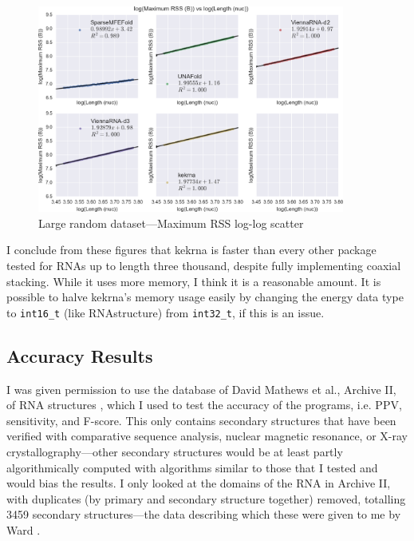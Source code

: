 \documentclass{cshonours}
\begin{document}
\begin{figure}[p]
\centering
\includegraphics[width=0.9\textwidth]{res/random_large_maxrss_loglog_scatter.png}
\caption{Large random dataset---Maximum RSS log-log scatter}
\label{fig:random_large_maxrss_loglog_scatter}
\end{figure}

I conclude from these figures that kekrna is faster than every other package tested for RNAs up to length three thousand, despite fully implementing coaxial stacking. While it uses more memory, I think it is a reasonable amount. It is possible to halve kekrna's memory usage easily by changing the energy data type to \texttt{int16\_t} (like RNAstructure) from \texttt{int32\_t}, if this is an issue.

\subsection{Accuracy Results}

I was given permission to use the database of David Mathews et al., Archive II, of RNA structures \cite{mathewsPersonal}, which I used to test the accuracy of the programs, i.e. PPV, sensitivity, and F-score. This only contains secondary structures that have been verified with comparative sequence analysis, nuclear magnetic resonance, or X-ray crystallography---other secondary structures would be at least partly algorithmically computed with algorithms similar to those that I tested and would bias the results. I only looked at the domains of the RNA in Archive II, with duplicates (by primary and secondary structure together) removed, totalling 3459 secondary structures---the data describing which these were given to me by Ward \cite{wardPersonal}.
\end{document}

